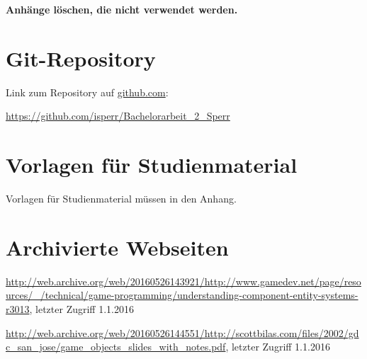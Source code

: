 \begin{appendices}

\textbf{\color{red} Anhänge löschen, die nicht verwendet werden.}


\section{Git-Repository}

Link zum Repository auf {\url{github.com}}:

{\url{https://github.com/isperr/Bachelorarbeit_2_Sperr}}
	
\section{Vorlagen für Studienmaterial}

Vorlagen für Studienmaterial müssen in den Anhang. 

\section{Archivierte Webseiten}
\sloppy
\url{http://web.archive.org/web/20160526143921/http://www.gamedev.net/page/resources/_/technical/game-programming/understanding-component-entity-systems-r3013}, letzter Zugriff 1.1.2016

\url{http://web.archive.org/web/20160526144551/http://scottbilas.com/files/2002/gdc_san_jose/game_objects_slides_with_notes.pdf}, letzter Zugriff 1.1.2016

\end{appendices}
